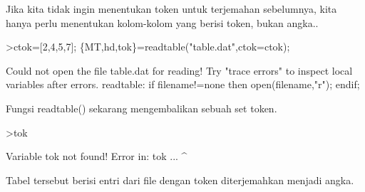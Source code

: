 \documentclass[a4paper,10pt]{article}
\begin{document}
\begin{eulernotebook}
\begin{eulercomment}
Jika kita tidak ingin menentukan token untuk terjemahan sebelumnya,
kita hanya perlu menentukan kolom-kolom yang berisi token, bukan
angka..
\end{eulercomment}
\begin{eulerprompt}
>ctok=[2,4,5,7]; \{MT,hd,tok\}=readtable("table.dat",ctok=ctok);
\end{eulerprompt}
\begin{euleroutput}
  Could not open the file
  table.dat
  for reading!
  Try "trace errors" to inspect local variables after errors.
  readtable:
      if filename!=none then open(filename,"r"); endif;
\end{euleroutput}
\begin{eulercomment}
Fungsi readtable() sekarang mengembalikan sebuah set token.
\end{eulercomment}
\begin{eulerprompt}
>tok
\end{eulerprompt}
\begin{euleroutput}
  Variable tok not found!
  Error in:
  tok ...
     ^
\end{euleroutput}
\begin{eulercomment}
Tabel tersebut berisi entri dari file dengan token diterjemahkan
menjadi angka.


\end{eulercomment}
\end{eulernotebook}
\end{document}
